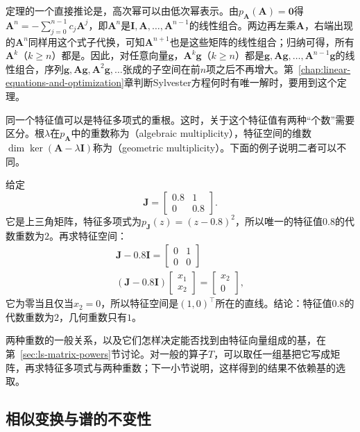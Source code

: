 定理的一个直接推论是，高次幂可以由低次幂表示。由$p_{\bm A}(\bm A)=\bm0$得$\bm A^n=-\sum_{j=0}^{n-1}c_j\bm A^j$，即$\bm A^n$是$\bm I,\bm A,\ldots,\bm A^{n-1}$的线性组合。两边再左乘$\bm A$，右端出现的$\bm A^n$同样用这个式子代换，可知$\bm A^{n+1}$也是这些矩阵的线性组合；归纳可得，所有$\bm A^k$（$k\geq n$）都是。因此，对任意向量$\bm g$，$\bm A^k\bm g$（$k\geq n$）都是$\bm g,\bm A\bm g,\ldots,\bm A^{n-1}\bm g$的线性组合，序列$\bm g,\bm A\bm g,\bm A^2\bm g,\ldots$张成的子空间在前$n$项之后不再增大。第~\ref{chap:linear-equations-and-optimization}章判断Sylvester方程何时有唯一解时，要用到这个定理。

同一个特征值可以是特征多项式的重根。这时，关于这个特征值有两种“个数”需要区分。根$\lambda$在$p_{\bm A}$中的重数称为（algebraic multiplicity），特征空间的维数$\dim\ker(\bm A-\lambda\bm I)$称为（geometric multiplicity）。下面的例子说明二者可以不同。
\begin{example}[代数重数大于几何重数]
\label{ex:ls-multiplicity-gap}
给定
\[
 \bm J=\begin{bmatrix}0.8&1\\0&0.8\end{bmatrix}.
\]
它是上三角矩阵，特征多项式为$p_{\bm J}(z)=(z-0.8)^2$，所以唯一的特征值$0.8$的代数重数为$2$。再求特征空间：
\[
\begin{gathered}
\bm J-0.8\bm I=\begin{bmatrix}0&1\\0&0\end{bmatrix}\\
(\bm J-0.8\bm I)\begin{bmatrix}x_1\\x_2\end{bmatrix}=\begin{bmatrix}x_2\\0\end{bmatrix},
\end{gathered}
\]
它为零当且仅当$x_2=0$，所以特征空间是$(1,0)^{\top}$所在的直线。结论：特征值$0.8$的代数重数为$2$，几何重数只有$1$。
\end{example}
两种重数的一般关系，以及它们怎样决定能否找到由特征向量组成的基，在第~\ref{sec:ls-matrix-powers}节讨论。对一般的算子$T$，可以取任一组基把它写成矩阵，再求特征多项式与两种重数；下一小节说明，这样得到的结果不依赖基的选取。

\subsection{相似变换与谱的不变性}
\label{sec:ls-eigen-similarity-invariance}

